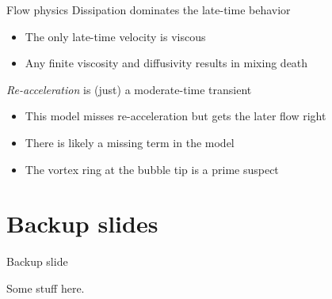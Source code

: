 \documentclass[12pt]{beamer}
\begin{document}
\begin{frame}{Flow physics}
Dissipation dominates the late-time behavior
\begin{itemize}
  \item The only late-time velocity is viscous
  \item Any finite viscosity and diffusivity results in mixing death
\end{itemize}

\textit{Re-acceleration} is (just) a moderate-time transient
\begin{itemize}
  \item This model misses re-acceleration but gets the later flow right
  \item There is likely a missing term in the model
  \item The vortex ring at the bubble tip is a prime suspect
\end{itemize}
\end{frame}

\appendix
\section*{Backup slides}
\begin{frame}{Backup slide}

	Some stuff here.

\end{frame}

\end{document}
